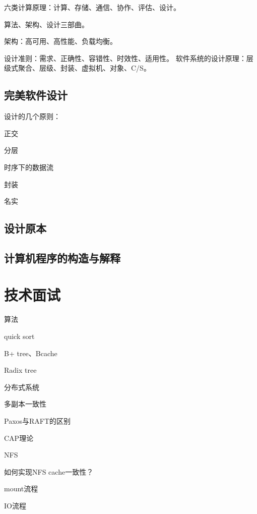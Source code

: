 六类计算原理：计算、存储、通信、协作、评估、设计。

算法、架构、设计三部曲。

架构：高可用、高性能、负载均衡。

设计准则：需求、正确性、容错性、时效性、适用性。
软件系统的设计原理：层级式聚合、层级、封装、虚拟机、对象、C/S。

\subsection{完美软件设计}

设计的几个原则：
\begin{enumbox}
\item 正交
\item 分层
\item 时序下的数据流
\item 封装
\item 名实
\end{enumbox}

\subsection{设计原本}

\subsection{计算机程序的构造与解释}

\section{技术面试}

算法
\begin{enumbox}
\item quick sort
\item B+ tree、Bcache
\item Radix tree
\end{enumbox}

分布式系统
\begin{enumbox}
\item 多副本一致性
\item Paxos与RAFT的区别
\item CAP理论
\end{enumbox}

NFS
\begin{enumbox}
\item 如何实现NFS cache一致性？
\item mount流程
\item IO流程
\end{enumbox}

